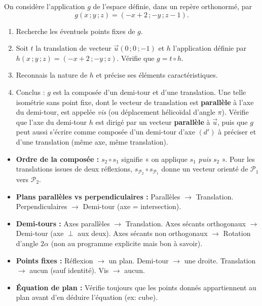 \documentclass[11pt]{article}
\begin{document}
\begin{exercice}
On considère l'application $g$ de l'espace définie, dans un repère orthonormé, par
\[ g(x\,;y\,;z)=(-x+2\,;-y\,;z-1). \]
\begin{enumerate}
\item Recherche les éventuels points fixes de $g$.
\item Soit $t$ la translation de vecteur $\vec{u}(0\,;0\,;-1)$ et $h$ l'application définie par $h(x\,;y\,;z)=(-x+2\,;-y\,;z)$. Vérifie que $g = t \circ h$.
\item Reconnais la nature de $h$ et précise ses éléments caractéristiques.
\item Conclus : $g$ est la composée d'un demi-tour et d'une translation. Une telle isométrie sans point fixe, dont le vecteur de translation est \textbf{parallèle} à l'axe du demi-tour, est appelée \emph{vis} (ou déplacement hélicoïdal d'angle $\pi$). Vérifie que l'axe du demi-tour $h$ est dirigé par un vecteur \textbf{parallèle} à $\vec{u}$, puis que $g$ peut aussi s'écrire comme composée d'un demi-tour d'axe $(d')$ à préciser et d'une translation (même axe, même translation).
\end{enumerate}
\end{exercice}

\begin{attention}
\begin{itemize}
\item \textbf{Ordre de la composée :} $s_2\circ s_1$ signifie « on applique $s_1$ \emph{puis} $s_2$ ». Pour les translations issues de deux réflexions, $s_{\mathcal{P}_2}\circ s_{\mathcal{P}_1}$ donne un vecteur orienté de $\mathcal{P}_1$ vers $\mathcal{P}_2$.
\item \textbf{Plans parallèles vs perpendiculaires :} Parallèles $\to$ Translation. Perpendiculaires $\to$ Demi-tour (axe = intersection).
\item \textbf{Demi-tours :} Axes parallèles $\to$ Translation. Axes sécants orthogonaux $\to$ Demi-tour (axe $\perp$ aux deux). Axes sécants non orthogonaux $\to$ Rotation d'angle $2\alpha$ (non au programme explicite mais bon à savoir).
\item \textbf{Points fixes :} Réflexion $\to$ un plan. Demi-tour $\to$ une droite. Translation $\to$ aucun (sauf identité). Vis $\to$ aucun.
\item \textbf{Équation de plan :} Vérifie toujours que les points donnés appartiennent au plan avant d'en déduire l'équation (ex: cube).
\end{itemize}
\end{attention}
\end{document}
